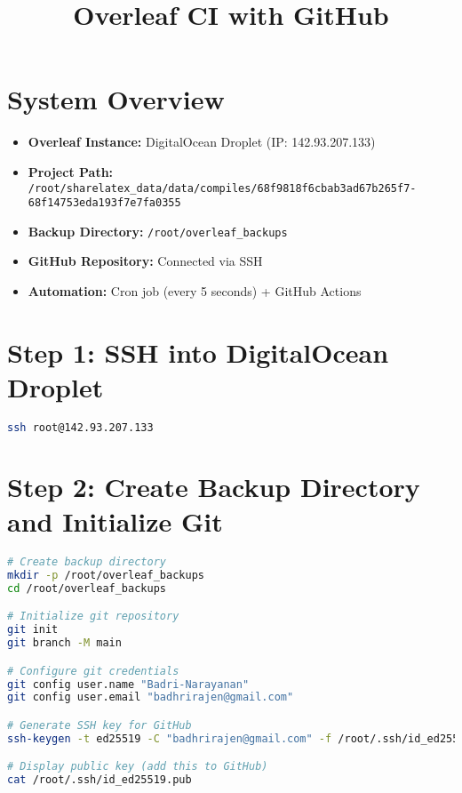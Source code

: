\title{Overleaf CI with GitHub}
\label{chap::overleafCI}



\section{System Overview}

\begin{itemize}
    \item \textbf{Overleaf Instance:} DigitalOcean Droplet (IP: 142.93.207.133)
    \item \textbf{Project Path:} \texttt{/root/sharelatex\_data/data/compiles/68f9818f6cbab3ad67b265f7-68f14753eda193f7e7fa0355}
    \item \textbf{Backup Directory:} \texttt{/root/overleaf\_backups}
    \item \textbf{GitHub Repository:} Connected via SSH
    \item \textbf{Automation:} Cron job (every 5 seconds) + GitHub Actions
\end{itemize}

\section{Step 1: SSH into DigitalOcean Droplet}

\begin{lstlisting}[language=bash]
ssh root@142.93.207.133
\end{lstlisting}

\section{Step 2: Create Backup Directory and Initialize Git}

\begin{lstlisting}[language=bash]
# Create backup directory
mkdir -p /root/overleaf_backups
cd /root/overleaf_backups

# Initialize git repository
git init
git branch -M main

# Configure git credentials
git config user.name "Badri-Narayanan"
git config user.email "badhrirajen@gmail.com"

# Generate SSH key for GitHub
ssh-keygen -t ed25519 -C "badhrirajen@gmail.com" -f /root/.ssh/id_ed25519 -N ""

# Display public key (add this to GitHub)
cat /root/.ssh/id_ed25519.pub
\end{lstlisting}

